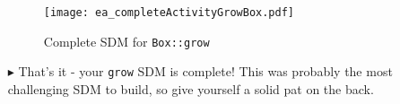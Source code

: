 \begin{itemize}

\begin{figure}[htbp]
\begin{center}
  \texttt{[image: ea\_completeActivityGrowBox.pdf]}
  \caption{Complete SDM for \texttt{Box::grow}}  
  \label{fig:sdm_grow_5}
\end{center}
\end{figure}

\item[$\blacktriangleright$]  That's it - your \texttt{grow} SDM is complete! This was probably the most challenging SDM to build, so give yourself a solid 
pat on the back.

\end{itemize}
